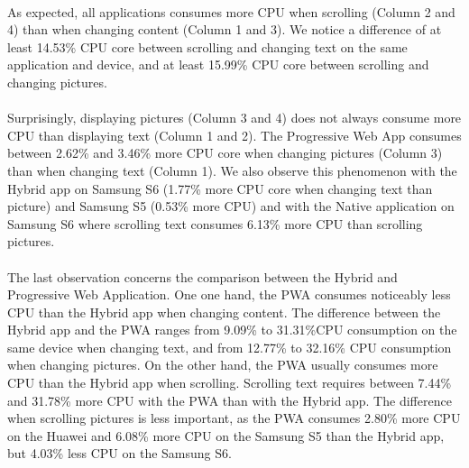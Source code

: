 \documentclass{kththesis}
\begin{document}
\paragraph{}
As expected, all applications consumes more CPU when scrolling (Column 2 and 4) than when changing content (Column 1 and 3). We notice a difference of at least 14.53\% CPU core between scrolling and changing text on the same application and device, and at least 15.99\% CPU core between scrolling and changing pictures.

\paragraph{}
Surprisingly, displaying pictures (Column 3 and 4) does not always consume more CPU than displaying text (Column 1 and 2). The Progressive Web App consumes between 2.62\% and 3.46\% more CPU core when changing pictures (Column 3) than when changing text (Column 1). We also observe this phenomenon with the Hybrid app on Samsung S6 (1.77\% more CPU core when changing text than picture) and Samsung S5 (0.53\% more CPU) and with the Native application on Samsung S6 where scrolling text consumes 6.13\% more CPU than scrolling pictures.


\paragraph{}
The last observation concerns the comparison between the Hybrid and Progressive Web Application. One one hand, the PWA consumes noticeably less CPU than the Hybrid app when changing content. The difference between the Hybrid app and the PWA ranges from 9.09\% to 31.31\%CPU consumption on the same device when changing text, and from 12.77\% to 32.16\% CPU consumption when changing pictures. On the other hand, the PWA usually consumes more CPU than the Hybrid app when scrolling. Scrolling text requires between 7.44\% and 31.78\% more CPU with the PWA than with the Hybrid app. The difference when scrolling pictures is less important, as the PWA consumes 2.80\% more CPU on the Huawei and 6.08\% more CPU on the Samsung S5 than the Hybrid app, but 4.03\% less CPU on the Samsung S6.

\end{document}
